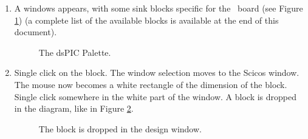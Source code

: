 \begin{enumerate}
\item
  A windows appears, with some sink blocks specific for the
  \flex\ board (see Figure \ref{fig:palette}) (a complete list of the available blocks is available at the end of this document).
%
\begin{figure}[htb]
\caption{The dsPIC Palette.}
\label{fig:palette}
\end{figure}

\item
  Single click on the  block. The window selection moves to
  the Scicos window. The mouse now becomes a white rectangle of the
  dimension of the  block. Single click somewhere in the
  white part of the window. A  block is dropped in the
  diagram, like in Figure \ref{fig:led}.
%
\begin{figure}[htb]
\caption{The  block is dropped in the design window.}
\label{fig:led}
\end{figure}


\end{enumerate}
